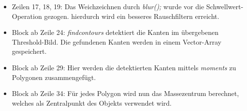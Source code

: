 	\begin{itemize}
	\item Zeilen 17, 18, 19: Das Weichzeichnen durch \textit{blur();} wurde vor die Schwellwert-Operation gezogen. hierdurch wird ein besseres Rauschfiltern erreicht.
	\item Block ab Zeile 24: \textit{findcontours} detektiert die Kanten im übergebenen Threshold-Bild. Die gefundenen Kanten werden in einem Vector-Array gespeichert.
	\item Block ab Zeile 29: Hier werden die detektierten Kanten mittels \textit{moments} zu Polygonen zusammengefügt.
	\item Block ab Zeile 34: Für jedes Polygon wird nun das Massezentrum berechnet, welches als Zentralpunkt des Objekts verwendet wird.
	\end{itemize}
	\cite{cv-findcontours}
